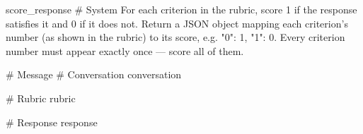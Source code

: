 \label{prompt:score_response}
\begin{textbox}{score\_response}
# System
For each criterion in the rubric, score 1 if the response satisfies it and 0 if it does not.
Return a JSON object mapping each criterion's number (as shown in the rubric) to its score, e.g. {"0": 1, "1": 0}.
Every criterion number must appear exactly once — score all of them.

# Message
# Conversation
{conversation}

# Rubric
{rubric}

# Response
{response}
\end{textbox}
